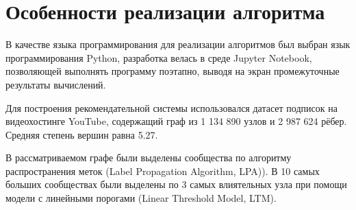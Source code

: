 \chapter{Особенности реализации алгоритма}

В качестве языка программирования для реализации алгоритмов был выбран язык программирования Python, разработка велась в среде Jupyter Notebook, позволяющей выполнять программу поэтапно, выводя на экран промежуточные результаты вычислений.

Для построения рекомендательной системы использовался датасет подписок на видеохостинге YouTube, содержащий граф из 1 134 890 узлов и 2 987 624 рёбер. Средняя степень вершин равна 5.27.

В рассматриваемом графе были выделены сообщества по алгоритму распространения меток (Label Propagation Algorithm, LPA)). В 10 самых больших сообществах были выделены по 3 самых влиятельных узла при помощи модели с линейными порогами (Linear Threshold Model, LTM).

\clearpage
